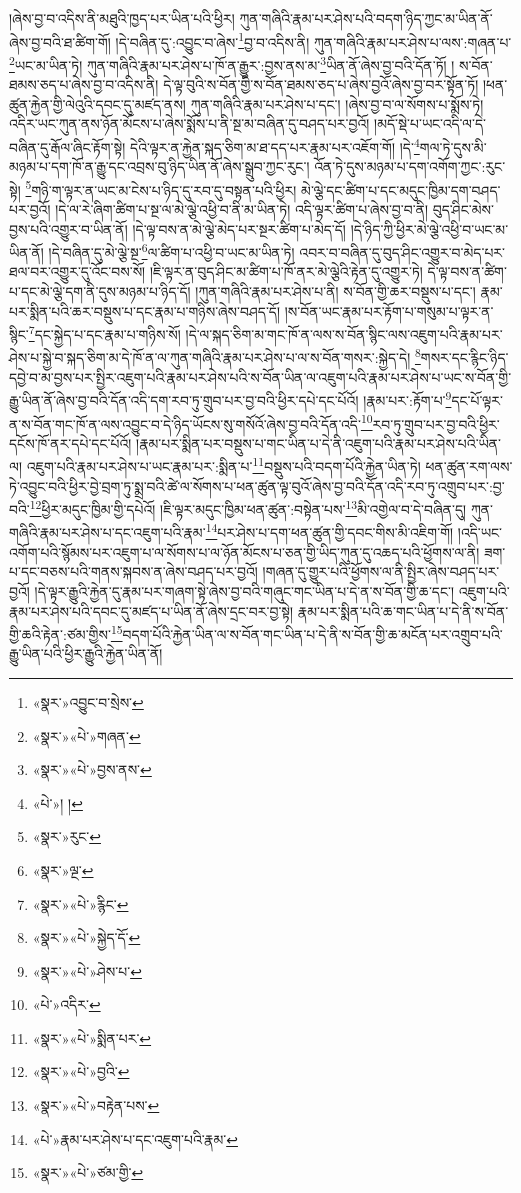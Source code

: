 །ཞེས་བྱ་བ་འདིས་ནི་མཐུའི་ཁྱད་པར་ཡིན་པའི་ཕྱིར། ཀུན་གཞིའི་རྣམ་པར་ཤེས་པའི་བདག་ཉིད་ཀྱང་མ་ཡིན་ནོ་ཞེས་བྱ་བའི་ཐ་ཚིག་གོ། །དེ་བཞིན་དུ་:འབྱུང་བ་ཞེས་\footnote{«སྣར་»འབྱུང་བ་སྲེས་}བྱ་བ་འདིས་ནི། ཀུན་གཞིའི་རྣམ་པར་ཤེས་པ་ལས་:གཞན་པ་\footnote{«སྣར་»«པེ་»གཞན་}ཡང་མ་ཡིན་ཏེ། ཀུན་གཞིའི་རྣམ་པར་ཤེས་པ་ཁོ་ན་རྒྱུར་:བྱས་ནས་མ་\footnote{«སྣར་»«པེ་»བྱས་ནས་}ཡིན་ནོ་ཞེས་བྱ་བའི་དོན་ཏོ། །
ས་བོན་ཐམས་ཅད་པ་ཞེས་བྱ་བ་འདིས་ནི། དེ་ལྟ་བུའི་ས་བོན་གྱི་ས་བོན་ཐམས་ཅད་པ་ཞེས་བྱའོ་ཞེས་བྱ་བར་སྟོན་ཏོ། །ཕན་ཚུན་རྐྱེན་གྱི་ལེའུའི་དབང་དུ་མཛད་ནས། ཀུན་གཞིའི་རྣམ་པར་ཤེས་པ་དང་། །ཞེས་བྱ་བ་ལ་སོགས་པ་སྨོས་ཏེ། འདིར་ཡང་ཀུན་ནས་ཉོན་མོངས་པ་ཞེས་སྨོས་པ་ནི་སྔ་མ་བཞིན་དུ་བཤད་པར་བྱའོ། །མདོ་སྡེ་པ་ཡང་འདི་ལ་དེ་བཞིན་དུ་རྒོལ་ཞིང་རྟོག་སྟེ། དེའི་ལྟར་ན་རྐྱེན་སྐད་ཅིག་མ་ཐ་དད་པར་རྣམ་པར་འཇོག་གོ། །དེ་\footnote{«པེ་»། །}གལ་ཏེ་དུས་མི་མཉམ་པ་དག་ཁོ་ན་རྒྱུ་དང་འབྲས་བུ་ཉིད་ཡིན་ནོ་ཞེས་སྒྲུབ་ཀྱང་རུང་། འོན་ཏེ་དུས་མཉམ་པ་དག་འགོག་ཀྱང་:རུང་སྟེ། \footnote{«སྣར་»རུང་}གཉི་ག་ལྟར་ན་ཡང་མ་ངེས་པ་ཉིད་དུ་རབ་དུ་བསྟན་པའི་ཕྱིར། མེ་ལྕེ་དང་ཚིག་པ་དང་མདུང་ཁྱིམ་དག་བཤད་པར་བྱའོ། །དེ་ལ་རེ་ཞིག་ཚིག་པ་སྔ་ལ་མེ་ལྕེ་འཕྱི་བ་ནི་མ་ཡིན་ཏེ། འདི་ལྟར་ཚིག་པ་ཞེས་བྱ་བ་ནི། བུད་ཤིང་མེས་བྱས་པའི་འགྱུར་བ་ཡིན་ནོ། །དེ་ལྟ་བས་ན་མེ་ལྕེ་མེད་པར་སྔར་ཚིག་པ་མེད་དོ། །དེ་ཉིད་ཀྱི་ཕྱིར་མེ་ལྕེ་འཕྱི་བ་ཡང་མ་ཡིན་ནོ། །དེ་བཞིན་དུ་མེ་ལྕེ་སྔ་\footnote{«སྣར་»ལྔ་}ལ་ཚིག་པ་འཕྱི་བ་ཡང་མ་ཡིན་ཏེ། འབར་བ་བཞིན་དུ་བུད་ཤིང་འགྱུར་བ་མེད་པར་ཐལ་བར་འགྱུར་དུ་འོང་བས་སོ། །ཇི་ལྟར་ན་བུད་ཤིང་མ་ཚིག་པ་ཁོ་ནར་མེ་ལྕེའི་རྟེན་དུ་འགྱུར་ཏེ། དེ་ལྟ་བས་ན་ཚིག་པ་དང་མེ་ལྕེ་དག་ནི་དུས་མཉམ་པ་ཉིད་དོ། །ཀུན་གཞིའི་རྣམ་པར་ཤེས་པ་ནི། ས་བོན་གྱི་ཆར་བསྡུས་པ་དང་། རྣམ་པར་སྨིན་པའི་ཆར་བསྡུས་པ་དང་རྣམ་པ་གཉིས་ཞེས་བཤད་དོ། །ས་བོན་ཡང་རྣམ་པར་རྟོག་པ་གསུམ་པ་ལྟར་ན་སྙིང་\footnote{«སྣར་»«པེ་»རྙིང་}དང་སྐྱེད་པ་དང་རྣམ་པ་གཉིས་སོ། །དེ་ལ་སྐད་ཅིག་མ་གང་ཁོ་ན་ལས་ས་བོན་སྙིང་ལས་འཇུག་པའི་རྣམ་པར་ཤེས་པ་སྐྱེ་བ་སྐད་ཅིག་མ་དེ་ཁོ་ན་ལ་ཀུན་གཞིའི་རྣམ་པར་ཤེས་པ་ལ་ས་བོན་གསར་:སྐྱེད་དེ། \footnote{«སྣར་»«པེ་»སྐྱེད་དོ་}གསར་དང་རྙིང་ཉིད་དབྱེ་བ་མ་བྱས་པར་སྤྱིར་འཇུག་པའི་རྣམ་པར་ཤེས་པའི་ས་བོན་ཡིན་ལ་འཇུག་པའི་རྣམ་པར་ཤེས་པ་ཡང་ས་བོན་གྱི་རྒྱུ་ཡིན་ནོ་ཞེས་བྱ་བའི་དོན་འདི་དག་རབ་ཏུ་གྲུབ་པར་བྱ་བའི་ཕྱིར་དཔེ་དང་པོའོ། །རྣམ་པར་:རྟོག་པ་\footnote{«སྣར་»«པེ་»ཤེས་པ་}དང་པོ་ལྟར་ན་ས་བོན་གང་ཁོ་ན་ལས་འབྱུང་བ་དེ་ཉིད་ཡོངས་སུ་གསོའོ་ཞེས་བྱ་བའི་དོན་འདི་\footnote{«པེ་»འདིར་}རབ་ཏུ་གྲུབ་པར་བྱ་བའི་ཕྱིར་དངོས་ཁོ་ནར་དཔེ་དང་པོའོ། །རྣམ་པར་སྨིན་པར་བསྡུས་པ་གང་ཡིན་པ་དེ་ནི་འཇུག་པའི་རྣམ་པར་ཤེས་པའི་ཡིན་ལ། འཇུག་པའི་རྣམ་པར་ཤེས་པ་ཡང་རྣམ་པར་:སྨིན་པ་\footnote{«སྣར་»«པེ་»སྨིན་པར་}བསྡུས་པའི་བདག་པོའི་རྐྱེན་ཡིན་ཏེ། ཕན་ཚུན་རག་ལས་ཏེ་འབྱུང་བའི་ཕྱིར་བྱེ་བྲག་ཏུ་སྨྲ་བའི་ཚེ་ལ་སོགས་པ་ཕན་ཚུན་ལྟ་བུའོ་ཞེས་བྱ་བའི་དོན་འདི་རབ་ཏུ་འགྲུབ་པར་:བྱ་བའི་\footnote{«སྣར་»«པེ་»བྱའི་}ཕྱིར་མདུང་ཁྱིམ་གྱི་དཔེའོ། །ཇི་ལྟར་མདུང་ཁྱིམ་ཕན་ཚུན་:བསྟེན་པས་\footnote{«སྣར་»«པེ་»བརྟེན་པས་}མི་འགྱེལ་བ་དེ་བཞིན་དུ། ཀུན་གཞིའི་རྣམ་པར་ཤེས་པ་དང་འཇུག་པའི་རྣམ་\footnote{«པེ་»རྣམ་པར་ཤེས་པ་དང་འཇུག་པའི་རྣམ་}པར་ཤེས་པ་དག་ཕན་ཚུན་གྱི་དབང་གིས་མི་འཇིག་གོ། །འདི་ཡང་འགོག་པའི་སྙོམས་པར་འཇུག་པ་ལ་སོགས་པ་ལ་ཉོན་མོངས་པ་ཅན་གྱི་ཡིད་ཀུན་དུ་འཆད་པའི་ཕྱོགས་ལ་ནི། ཟག་པ་དང་བཅས་པའི་གནས་སྐབས་ན་ཞེས་བཤད་པར་བྱའོ། །གཞན་དུ་གྱུར་པའི་ཕྱོགས་ལ་ནི་སྤྱིར་ཞེས་བཤད་པར་བྱའོ། །དེ་ལྟར་རྒྱུའི་རྐྱེན་དུ་རྣམ་པར་གཞག་སྟེ་ཞེས་བྱ་བའི་གཞུང་གང་ཡིན་པ་དེ་ན་ས་བོན་གྱི་ཆ་དང་། འཇུག་པའི་རྣམ་པར་ཤེས་པའི་དབང་དུ་མཛད་པ་ཡིན་ནོ་ཞེས་དྲང་བར་བྱ་སྟེ། རྣམ་པར་སྨིན་པའི་ཆ་གང་ཡིན་པ་དེ་ནི་ས་བོན་གྱི་ཆའི་རྟེན་:ཙམ་གྱིས་\footnote{«སྣར་»«པེ་»ཙམ་གྱི་}བདག་པོའི་རྐྱེན་ཡིན་ལ་ས་བོན་གང་ཡིན་པ་དེ་ནི་ས་བོན་གྱི་ཆ་མངོན་པར་འགྲུབ་པའི་རྒྱུ་ཡིན་པའི་ཕྱིར་རྒྱུའི་རྐྱེན་ཡིན་ནོ། 